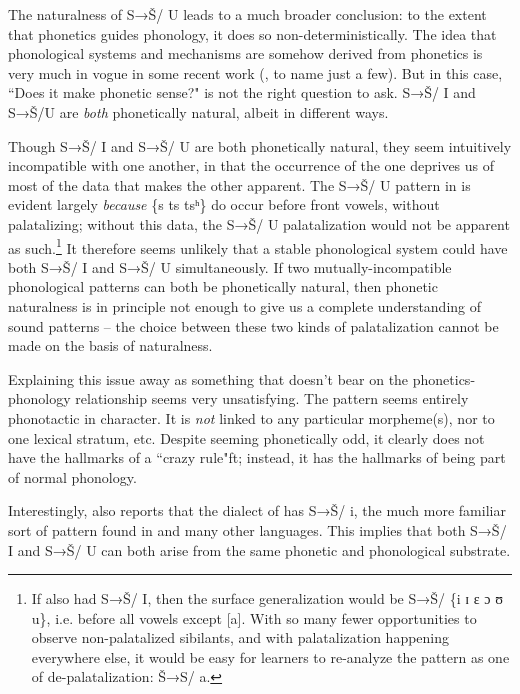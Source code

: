 \documentclass[output=paper,newtxmath,modfonts,nonflat]{langsci/langscibook}
\begin{document}
The naturalness of S→Š/ {\longrule} U leads to a much broader conclusion: to the extent that phonetics guides phonology, it does so non-deterministically. The idea that phonological systems and mechanisms are somehow derived from phonetics is very much in vogue in some recent work (\citealt{Ohala1981,Ohala1990,Ohala:2004aa,Hayes1999,Steriade2008,Kawahara2008}, to name just a few). But in this case, ``Does it make phonetic sense?" is not the right question to ask. S→Š/ {\longrule} I and S→Š/{\longrule}U are \textit{both} phonetically natural, albeit in different ways.

Though S→Š/ {\longrule} I and S→Š/ {\longrule} U are both phonetically natural, they seem intuitively incompatible with one another, in that the occurrence of the one deprives us of most of the data that makes the other apparent. The S→Š/ {\longrule} U pattern in  is evident largely \textit{because} \{s ts tsʰ\} do occur before front vowels, without palatalizing; without this data, the S→Š/ {\longrule} U palatalization would not be apparent as such.\footnote{If  also had S→Š/ {\longrule} I, then the surface generalization would be S→Š/ {\longrule} \{i ɪ ɛ ɔ ʊ u\}, i.e. before all vowels except [a]. With so many fewer opportunities to observe non-palatalized sibilants, and with palatalization happening everywhere else, it would be easy for learners to re-analyze the pattern as one of de-palatalization: Š→S/ {\longrule} a.} It therefore seems unlikely that a stable phonological system could have both S→Š/ {\longrule} I and S→Š/ {\longrule} U simultaneously. If two mutually-incompatible phonological patterns can both be phonetically natural, then phonetic naturalness is in principle not enough to give us a complete understanding of sound patterns – the choice between these two kinds of palatalization cannot be made on the basis of naturalness.

Explaining this issue away as something that doesn’t bear on the phonetics-phonology relationship seems very unsatisfying. The  pattern seems entirely phonotactic in character. It is \textit{not} linked to any particular morpheme(s), nor to one lexical stratum, etc. Despite seeming phonetically odd, it clearly does not have the hallmarks of a ``crazy rule"ft; instead, it has the hallmarks of being part of normal phonology. 

Interestingly, \citet{Malepe1966} also reports that the  dialect of  has S→Š/ {\longrule} i, the much more familiar sort of pattern found in  and many other languages. This implies that both S→Š/ {\longrule} I and S→Š/ {\longrule} U can both arise from the same phonetic and phonological substrate. 
\end{document}
